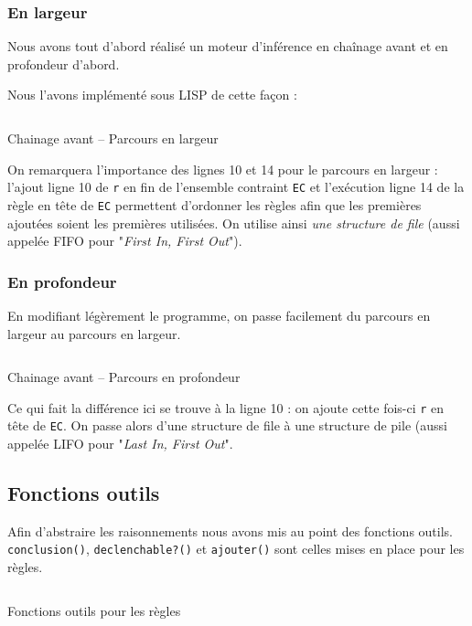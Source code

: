 \documentclass[a4paper,12pt]{article}
\begin{document}
\subsubsection{En largeur}

	Nous avons tout d'abord réalisé un moteur d'inférence en chaînage avant et en profondeur d'abord.

Nous l'avons implémenté sous LISP de cette façon :

\begin{listing}[H]
	\centering
	\inputminted[breaklines=true,linenos]{lisp}{../chainageAvantLarg.lisp}
	\caption{Chainage avant -- Parcours en largeur}
\end{listing}

On remarquera l'importance des lignes 10 et 14 pour le parcours en largeur : l'ajout ligne 10 de \texttt{r} en fin de l'ensemble contraint \texttt{EC} et l'exécution ligne 14 de la règle en tête de \texttt{EC} permettent d'ordonner les règles afin que les premières ajoutées soient les premières utilisées. On utilise ainsi \textit{une structure de file} (aussi appelée FIFO pour "\textit{First In, First Out}").

\subsubsection{En profondeur}

En modifiant légèrement le programme, on passe facilement du parcours en largeur au parcours en largeur.

\begin{listing}[H]
	\centering
	\inputminted[breaklines=true,linenos]{lisp}{../chainageAvantProf.lisp}
	\caption{Chainage avant -- Parcours en profondeur}
\end{listing}


Ce qui fait la différence ici se trouve à la ligne 10 : on ajoute cette fois-ci \texttt{r} en tête de \texttt{EC}. On passe alors d'une structure de file à une structure de pile (aussi appelée LIFO pour "\textit{Last In, First Out}".

\subsection{Fonctions outils}

Afin d'abstraire les raisonnements nous avons mis au point des fonctions outils. \texttt{conclusion()}, \texttt{declenchable?()} et \texttt{ajouter()} sont celles mises en place pour les règles.
\begin{listing}[H]
	\centering
	\inputminted[breaklines=true,linenos]{lisp}{../fonctionsOutilsRegles.lisp}
	\caption{Fonctions outils pour les règles}
\end{listing}
\end{document}
